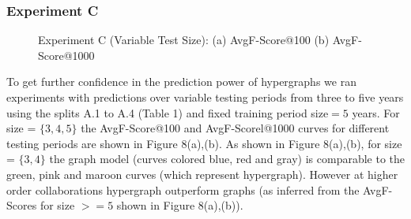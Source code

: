 \documentclass{sig-alternate}
\begin{document}
\subsubsection{Experiment C}

\begin{figure}
        \centering
        \caption{Experiment C (Variable Test Size): (a) AvgF-Score@100 (b) AvgF-Score@1000}
        \label{fig:EXPB}
\vspace{-1.6em}
\end{figure}

To get further confidence in the prediction power of hypergraphs we ran experiments with predictions over variable testing periods from three to five years using the splits A.1 to A.4 (Table 1) and fixed training period size$=5$ years. For size = $\{3,4,5\}$ the AvgF-Score@100 and AvgF-Scorel@1000 curves for different testing periods are shown in Figure 8(a),(b). As shown in Figure 8(a),(b), for size = $\{3,4\}$ the graph model (curves colored blue, red and gray) is comparable to the green, pink and maroon curves (which represent hypergraph). However at higher order collaborations hypergraph outperform graphs (as inferred from the AvgF-Scores for size $>=5$ shown in Figure 8(a),(b)).


\end{document}
